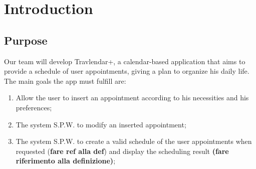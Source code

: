 \chapter{Introduction}

\section{Purpose}

Our team will develop Travlendar+, a calendar-based application that aims to provide a schedule of user appointments, giving a plan to organize his daily life.
The main goals the app must fulfill are:

\begin{enumerate}
\renewcommand\labelenumi{\textbf{G\theenumi}}

\item Allow the user to insert an appointment according to his necessities and his preferences;
\label{goal:G2}

\item The system S.P.W. to modify an inserted appointment;
\label{goal:G3} 

\item The system S.P.W. to create a valid schedule of the user appointments when requested (\textbf{fare ref alla def}) and display the scheduling result \textbf{(fare riferimento alla definizione)};
\label{goal:G4}


\end{enumerate}
